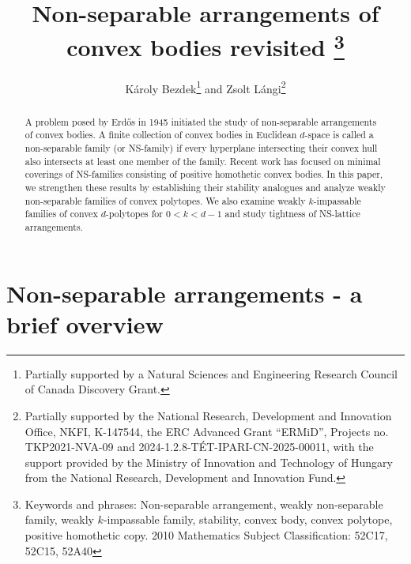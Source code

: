 \documentclass[12pt]{article}
\title{Non-separable arrangements of convex bodies revisited
\footnote{Keywords and phrases: Non-separable arrangement, weakly non-separable family, weakly $k$-impassable family, stability, convex body, convex polytope, positive homothetic copy. \newline \hspace*{.35cm} 2010 Mathematics Subject Classification: 52C17, 52C15, 52A40}}
\author{K\'{a}roly Bezdek\thanks{Partially supported by a Natural Sciences and 
Engineering Research Council of Canada Discovery Grant.} and Zsolt L\'angi\thanks{Partially supported by the National Research, Development and Innovation Office, NKFI, K-147544, the ERC Advanced Grant ``ERMiD'', Projects no. TKP2021-NVA-09 and 2024-1.2.8-T\'ET-IPARI-CN-2025-00011, with the
support provided by the Ministry of Innovation and Technology of Hungary from the National Research, Development and Innovation Fund.}
}
\begin{document}
\maketitle


\begin{abstract}
A problem posed by Erd\H os in 1945 initiated the study of non-separable arrangements of convex bodies. A finite collection of convex bodies in Euclidean $d$-space is called a non-separable family (or NS-family) if every hyperplane intersecting their convex hull also intersects at least one member of the family. Recent work has focused on minimal coverings of NS-families consisting of positive homothetic convex bodies. In this paper, we strengthen these results by establishing their stability analogues and analyze weakly non-separable families of convex polytopes. We also examine weakly $k$-impassable families of convex $d$-polytopes for $0<k<d-1$ and study tightness of NS-lattice arrangements. 
\end{abstract}




\section{Non-separable arrangements - a brief overview}
\end{document}
